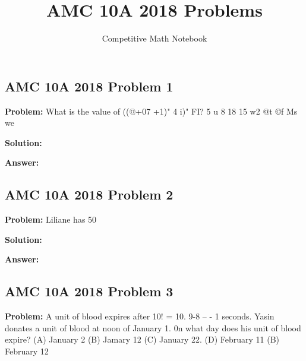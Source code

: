 \documentclass{article}
\title{AMC 10A 2018 Problems}
\author{Competitive Math Notebook}
\date{}
\newenvironment{problem}{\textbf{Problem: }}{\\}
\newenvironment{solution}{\textbf{Solution: }}{\\}
\newenvironment{answer}{\textbf{Answer: }}{\\}
\begin{document}
\maketitle

\subsection{AMC 10A 2018 Problem 1}

\begin{problem}
What is the value of ((@+07 +1)" 4 i)" FI? 5 u 8 18 15 w2 @t ©f Ms we
\end{problem}

\begin{solution}
\end{solution}

\begin{answer}
\end{answer}

\subsection{AMC 10A 2018 Problem 2}

\begin{problem}
Liliane has 50%
\end{problem}

\begin{solution}
\end{solution}

\begin{answer}
\end{answer}

\subsection{AMC 10A 2018 Problem 3}

\begin{problem}
A unit of blood expires after 10! = 10. 9-8 -- - 1 seconds. Yasin donates a unit of blood at noon of January 1. 0n what day does his unit of blood expire? (A) January 2 (B) Jamary 12 (C) January 22. (D) February 11 (B) February 12
\end{problem}
\end{document}
